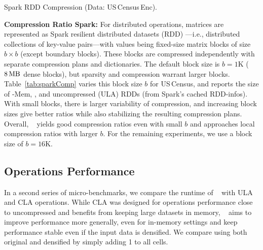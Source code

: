 \begin{table} [!t] \setlength\tabcolsep{10pt}
	\caption{\label{tab:sparkComp}Spark RDD Compression {\normalfont(Data: US\,Census\,Enc)}.}
	\vspace{-0.4cm}

	

\end{table}

\textbf{Compression Ratio Spark:}
For distributed operations, matrices are represented as Spark resilient distributed datasets (RDD) \cite{ZahariaCDDMMFSS12}---i.e.,
distributed collections of key-value pairs---with values being fixed-size matrix blocks of size $b \times b$ (except boundary blocks).
These blocks are compressed independently with separate compression plans and dictionaries.
The default block size is $b=1\text{K}$ ($8\mb$ dense blocks), but sparsity and compression warrant larger blocks.
Table~\ref{tab:sparkComp} varies this block size $b$ for US\,Census, and reports the size of \name-Mem, \name, and uncompressed (ULA) RDDs (from Spark's cached RDD-infos).
With small blocks, there is larger variability of compression, and increasing block sizes give better ratios while also stabilizing the resulting compression plans.
Overall, \name~ yields good compression ratios even with small $b$ and approaches local compression ratios with larger $b$.
For the remaining experiments, we use a block size of $b=16\text{K}$.


\subsection{Operations Performance}
\label{sec:OperationPerformance}

In a second series of micro-benchmarks, we compare the runtime of \name~ with ULA and CLA operations.
While CLA was designed for operations performance close to uncompressed and benefits from keeping large datasets in memory,
\name~ aims to improve performance more generally, even for in-memory settings and keep performance stable even if the input data is densified.
We compare using both original and densified by simply adding 1 to all cells.

